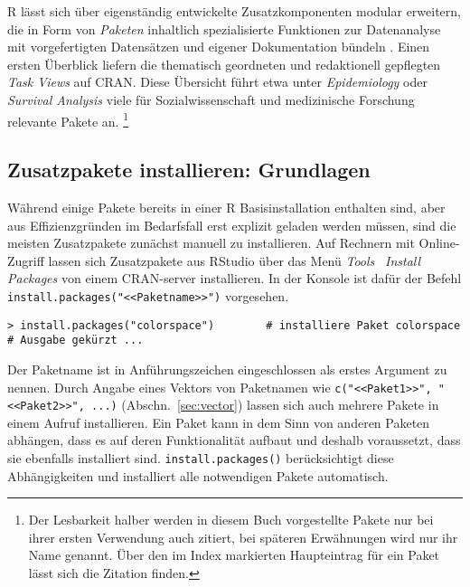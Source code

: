 R lässt sich über eigenständig entwickelte Zusatzkomponenten modular erweitern, die in Form von \emph{Paketen} inhaltlich spezialisierte Funktionen zur Datenanalyse mit vorgefertigten Datensätzen und eigener Dokumentation bündeln \cite{Ligges2003a}. %
Einen ersten Überblick liefern die thematisch geordneten und redaktionell gepflegten \emph{Task Views} auf CRAN. Diese Übersicht führt etwa unter \emph{Epidemiology} \cite{CRANtvEpi} oder \emph{Survival Analysis} \cite{CRANtvSurvival} viele für Sozialwissenschaft und medizinische Forschung relevante Pakete an.%
\footnote{Der Lesbarkeit halber werden in diesem Buch vorgestellte Pakete nur bei ihrer ersten Verwendung auch zitiert, bei späteren Erwähnungen wird nur ihr Name genannt. Über den im Index markierten Haupteintrag für ein Paket lässt sich die Zitation finden.}

\subsection{Zusatzpakete installieren: Grundlagen}

Während einige Pakete bereits in einer R Basisinstallation enthalten sind, aber aus Effizienzgründen im Bedarfsfall erst explizit geladen werden müssen, sind die meisten Zusatzpakete zunächst manuell zu installieren. Auf Rechnern mit Online-Zugriff lassen sich Zusatzpakete aus RStudio über das Menü \emph{Tools} \textrightarrow\ \emph{Install Packages} von einem CRAN-server installieren. In der Konsole ist dafür der Befehl \lstinline!install.packages("<<Paketname>>")! vorgesehen.
\begin{lstlisting}
> install.packages("colorspace")        # installiere Paket colorspace
# Ausgabe gekürzt ...
\end{lstlisting}

Der Paketname ist in Anführungszeichen eingeschlossen als erstes Argument zu nennen. Durch Angabe eines Vektors von Paketnamen wie \lstinline!c("<<Paket1>>", "<<Paket2>>", ...)! (Abschn.\ \ref{sec:vector}) lassen sich auch mehrere Pakete in einem Aufruf installieren. Ein Paket kann in dem Sinn von anderen Paketen abhängen, dass es auf deren Funktionalität aufbaut und deshalb voraussetzt, dass sie ebenfalls installiert sind. \lstinline!install.packages()! berücksichtigt diese Abhängigkeiten und installiert alle notwendigen Pakete automatisch.

